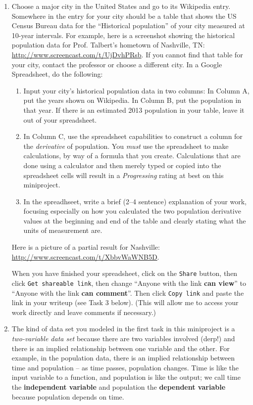 \documentclass[11pt,letterpaper]{article}
\begin{document}
\begin{enumerate}
	\item Choose a major city in the United States and go to its Wikipedia entry. Somewhere in the entry for your city should be a table that shows the US Census Bureau data for the ``Historical population'' of your city measured at 10-year intervals. For example, here is a screenshot showing the historical population data for Prof. Talbert's hometown of Nashville, TN: \url{http://www.screencast.com/t/UjDvhPRsb}. If you cannot find that table for your city, contact the professor or choose a different city. In a Google Spreadsheet, do the following: 
		\begin{enumerate}
			\item Input your city's historical population data in two columns: In Column A, put the years shown on Wikipedia. In Column B, put the population in that year. If there is an estimated 2013 population in your table, leave it out of your spreadsheet. 
			\item In Column C, use the spreadsheet capabilities to construct a column for the \emph{derivative} of population. You \emph{must} use the spreadsheet to make calculations, by way of a formula that you create. Calculations that are done using a calculator and then merely typed or copied into the spreadsheet cells will result in a \emph{Progressing} rating at best on this miniproject.
			\item In the spreadhseet, write a brief (2--4 sentence) explanation of your work, focusing especially on how you calculated the two population derivative values at the beginning and end of the table and clearly stating what the units of measurement are. 
		\end{enumerate}
	Here is a picture of a partial result for Nashville: \url{http://www.screencast.com/t/XbbvWaWNB5D}. 

	When you have finished your spreadsheet, click on the \texttt{Share} button, then click \texttt{Get shareable link}, then change ``Anyone with the link \textbf{can view}'' to ``Anyone with the link \textbf{can comment}''. Then click \texttt{Copy link} and paste the link in your writeup (see Task 3 below). (This will allow me to access your work directly and leave comments if necessary.)


	\item The kind of data set you modeled in the first task in this miniproject is a \emph{two-variable data set} because there are two variables involved (derp!) and there is an implied relationship between one variable and the other. For example, in the population data, there is an implied relationship between time and population -- as time passes, population changes. Time is like the input variable to a function, and population is like the output; we call time the \textbf{independent variable} and population the \textbf{dependent variable} because population depends on time. 


\end{enumerate}
\end{document}
